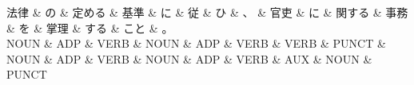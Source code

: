 \documentclass[tikz,border=5pt]{standalone}
\begin{document}
\normalsize
\begin{dependency}[edge unit distance=12.0pt]
    \begin{deptext}[column sep=1em]
        法律 \& の \& 定める \& 基準 \& に \& 従 \& ひ \& 、 \& 官吏 \& に \& 関する \& 事務 \& を \& 掌理 \& する \& こと \& 。\\
        NOUN \& ADP \& VERB \& NOUN \& ADP \& VERB \& VERB \& PUNCT \& NOUN \& ADP \& VERB \& NOUN \& ADP \& VERB \& AUX \& NOUN \& PUNCT\\
    \end{deptext}
\end{dependency}
\end{document}

